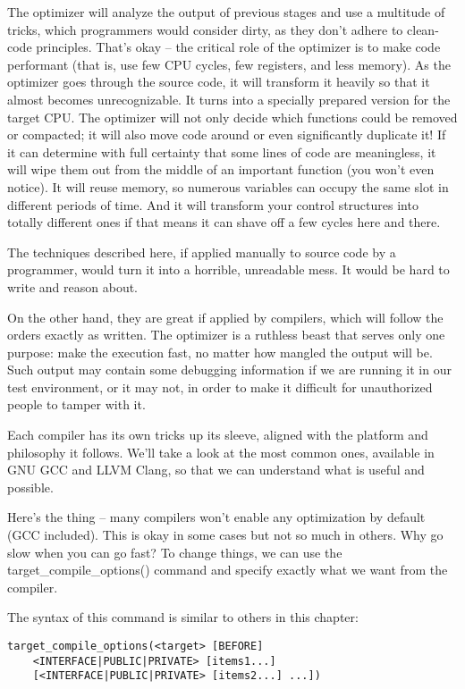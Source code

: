 
The optimizer will analyze the output of previous stages and use a multitude of tricks, which programmers would consider dirty, as they don't adhere to clean-code principles.
That's okay – the critical role of the optimizer is to make code performant (that is, use few CPU cycles, few registers, and less memory). As the optimizer goes through the source code, it will transform it heavily so that it almost becomes unrecognizable. It turns into a specially prepared version for the target CPU.
The optimizer will not only decide which functions could be removed or compacted; it will also move code around or even significantly duplicate it! If it can determine with full certainty that some lines of code are meaningless, it will wipe them out from the middle of an important function (you won't even notice). It will reuse memory, so numerous variables can occupy the same slot in different periods of time. And it will transform your control structures into totally different ones if that means it can shave off a few cycles here and there.

The techniques described here, if applied manually to source code by a programmer, would turn it into a horrible, unreadable mess. It would be hard to write and reason about.

On the other hand, they are great if applied by compilers, which will follow the orders exactly as written. The optimizer is a ruthless beast that serves only one purpose: make the execution fast, no matter how mangled the output will be. Such output may contain some debugging information if we are running it in our test environment, or it may not, in order to make it difficult for unauthorized people to tamper with it.

Each compiler has its own tricks up its sleeve, aligned with the platform and philosophy it follows. We'll take a look at the most common ones, available in GNU GCC and LLVM Clang, so that we can understand what is useful and possible.

Here's the thing – many compilers won't enable any optimization by default (GCC included). This is okay in some cases but not so much in others. Why go slow when you can go fast? To change things, we can use the target\_compile\_options() command and specify exactly what we want from the compiler.

The syntax of this command is similar to others in this chapter:

\begin{lstlisting}[style=styleCMake]
target_compile_options(<target> [BEFORE]
	<INTERFACE|PUBLIC|PRIVATE> [items1...]
	[<INTERFACE|PUBLIC|PRIVATE> [items2...] ...])
\end{lstlisting}  

